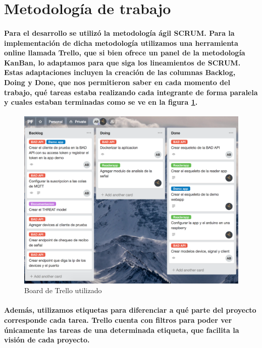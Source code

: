 \documentclass{article}
\begin{document}
\section{Metodología de trabajo}
\paragraph{
Para el desarrollo se utilizó la metodología ágil SCRUM. Para la implementación de dicha metodología utilizamos una herramienta online llamada Trello, que si bien ofrece un panel de la metodología KanBan, lo adaptamos para que siga los lineamientos de SCRUM. Estas adaptaciones incluyen la creación de las columnas Backlog, Doing y Done, que nos permitieron saber en cada momento del trabajo, qué tareas estaba realizando cada integrante de forma paralela y cuales estaban terminadas como se ve en la figura \ref{fig:trelloboard}.
}

\begin{figure}[ht]
    \centering
    \includegraphics[width=\textwidth]{trelloboard.png}%
    \caption{Board de Trello utilizado}
    \label{fig:trelloboard}
\end{figure}

\paragraph{
Además, utilizamos etiquetas para diferenciar a qué parte del proyecto corresponde cada tarea. Trello cuenta con filtros para poder ver únicamente las tareas de una determinada etiqueta, que facilita la visión de cada proyecto.
}
\end{document}

